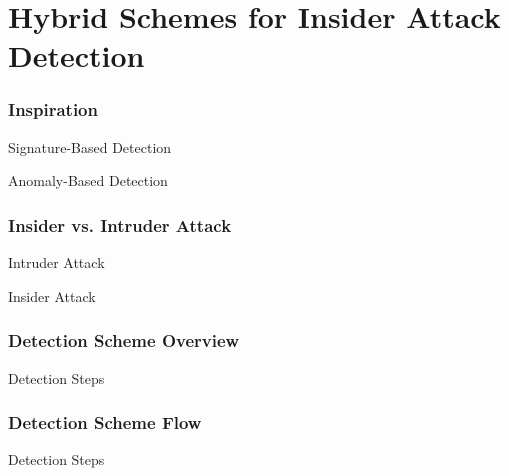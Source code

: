 \documentclass[10pt,mathserif]{beamer}
\begin{document}
\section{Hybrid Schemes for Insider Attack Detection}

\begin{frame}
  \frametitle{Inspiration}
  \begin{block}{Signature-Based Detection}
  \end{block}
  \begin{block}{Anomaly-Based Detection}
  \end{block}
\end{frame}
\begin{frame}
  \frametitle{Insider vs. Intruder Attack}
  \begin{block}{Intruder Attack}
  \end{block}
  \begin{block}{Insider Attack}
  \end{block}
\end{frame}
\begin{frame}
  \frametitle{Detection Scheme Overview}
  \begin{block}{Detection Steps}
  \end{block}
\end{frame}
\begin{frame}
  \frametitle{Detection Scheme Flow}
  \begin{block}{Detection Steps}
  \end{block}
\end{frame}
\end{document}
